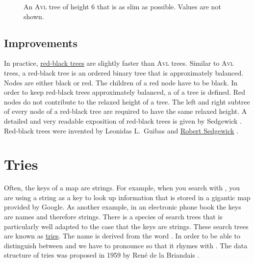 \begin{figure}[!ht]
  \centering
  \caption{An \textsc{Avl} tree of height 6 that is as slim as possible. Values are not shown.}
  \label{fig:avl-worst-case}
\end{figure}

\subsection{Improvements}
In practice, 
\href{https://en.wikipedia.org/wiki/Red-black_trees}{red-black trees} 
are slightly faster than \textsc{Avl} trees.  Similar to
\textsc{Avl} trees, a  red-black tree
  is an ordered binary tree that is approximately balanced.  Nodes are either black or red.
The children of a red node have to be black.  In order to keep red-black trees approximately
balanced, a  of a tree is defined.  Red nodes do not contribute to the relaxed
height of a tree.  The left and right subtree of every node of a red-black tree are required to have the same 
relaxed height.  A detailed and very readable exposition of red-black trees is given by Sedgewick
\cite{sedgewick:11}.  Red-black trees were invented by Leonidas L.~Guibas and 
\href{https://en.wikipedia.org/wiki/Robert_Sedgewick_(computer_scientist)}{Robert Sedgewick} \cite{guibas:78}.

\section{Tries}
Often, the keys of a map are strings.  For example, when you search with 
\href{https://www.google.com}{}, you are using
a string as a key to look up information that is stored in a gigantic map provided by Google.
As another example, in an electronic phone book the keys are names and therefore strings.  
There is a species of search trees that is particularly well adapted to the case that the keys are
strings.  These search trees are known as \href{https://en.wikipedia.org/?title=Trie}{tries}.  
The name is derived from the word
.  In order to be able to distinguish between  and
 we have to pronounce    so that it rhymes with .   The data
structure of tries was proposed in 1959 by Ren\'e de la Briandais \cite{briandais:59}.

